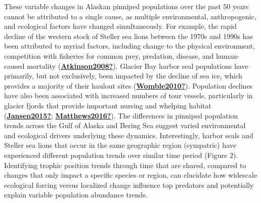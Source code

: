 \documentclass [11pt, proquest] {uwthesis}[2015/03/03]
\begin{document}
These variable changes in Alaskan pinniped populations over the past 50 years cannot be attributed to a single cause, as multiple environmental, anthropogenic, and ecological factors have changed simultaneously. For example, the rapid decline of the western stock of Steller sea lions between the 1970s and 1990s has been attributed to myriad factors, including change to the physical environment, competition with fisheries for common prey, predation, disease, and human-caused mortality (\protect\hyperlink{ref-Atkinson2008}{\textbf{Atkinson2008?}}). Glacier Bay harbor seal populations have primarily, but not exclusively, been impacted by the decline of sea ice, which provides a majority of their haulout sites (\protect\hyperlink{ref-Womble2010}{\textbf{Womble2010?}}). Population declines have also been associated with increased numbers of tour vessels, particularly in glacier fjords that provide important nursing and whelping habitat (\protect\hyperlink{ref-Jansen2015}{\textbf{Jansen2015?}}; \protect\hyperlink{ref-Matthews2016}{\textbf{Matthews2016?}}). The differences in pinniped population trends across the Gulf of Alaska and Bering Sea suggest varied environmental and ecological drivers underlying these dynamics. Interestingly, harbor seals and Steller sea lions that occur in the same geographic region (sympatric) have experienced different population trends over similar time period (Figure 2). Identifying trophic position trends through time that are shared, compared to changes that only impact a specific species or region, can elucidate how widescale ecological forcing versus localized change influence top predators and potentially explain variable population abundance trends.
\end{document}
